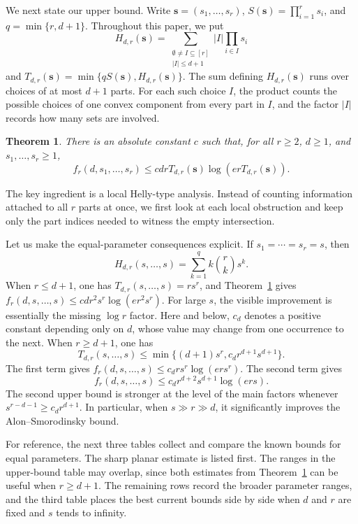 \documentclass[11pt]{article}
\newtheorem{theorem}{Theorem}[section]
\theoremstyle{definition}
\newcommand*{\abs}[1]{\lvert#1\rvert}
\begin{document}
We next state our upper bound. Write \(\boldsymbol{s}=(s_{1},\ldots,s_{r})\), \(S(\boldsymbol{s})=\prod_{i=1}^{r}s_{i}\), and \(q=\min\{r,d+1\}\). Throughout this paper, we put
\[
H_{d,r}(\boldsymbol{s})=\sum_{\substack{\emptyset\ne I\subseteq [r]\\ \abs{I}\le d+1}}\abs{I}\prod_{i\in I}s_{i}
\]
and \(T_{d,r}(\boldsymbol{s})=\min\{qS(\boldsymbol{s}),H_{d,r}(\boldsymbol{s})\}\). The sum defining \(H_{d,r}(\boldsymbol{s})\) runs over choices of at most \(d+1\) parts. For each such choice \(I\), the product counts the possible choices of one convex component from every part in \(I\), and the factor \(\abs{I}\) records how many sets are involved.
\begin{theorem}\label{thm:general-upper}
There is an absolute constant \(c\) such that, for all \(r\ge 2\), \(d\ge 1\), and \(s_{1},\ldots,s_{r}\ge 1\),
\[
f_{r}(d,s_{1},\ldots,s_{r})\le cdrT_{d,r}(\boldsymbol{s})\log(erT_{d,r}(\boldsymbol{s})).
\]
\end{theorem}

The key ingredient is a local Helly-type analysis. Instead of counting information attached to all \(r\) parts at once, we first look at each local obstruction and keep only the part indices needed to witness the empty intersection.

Let us make the equal-parameter consequences explicit. If \(s_{1}=\cdots=s_{r}=s\), then
\[
H_{d,r}(s,\ldots,s)=\sum_{k=1}^{q}k\binom{r}{k}s^{k}.
\]
When \(r\le d+1\), one has \(T_{d,r}(s,\ldots,s)=rs^{r}\), and Theorem~\ref{thm:general-upper} gives \(f_{r}(d,s,\ldots,s)\le cdr^{2}s^{r}\log(er^{2}s^{r})\). For large \(s\), the visible improvement is essentially the missing \(\log r\) factor. Here and below, \(c_{d}\) denotes a positive constant depending only on \(d\), whose value may change from one occurrence to the next. When \(r\ge d+1\), one has
\[
T_{d,r}(s,\ldots,s)\le \min\{(d+1)s^{r},c_{d}r^{d+1}s^{d+1}\}.
\]
The first term gives \(f_{r}(d,s,\ldots,s)\le c_{d}rs^{r}\log(ers^{r})\). The second term gives
\[
f_{r}(d,s,\ldots,s)\le c_{d}r^{d+2}s^{d+1}\log(ers).
\]
The second upper bound is stronger at the level of the main factors whenever \(s^{r-d-1}\ge c_{d}r^{d+1}\). In particular, when \(s\gg r\gg d\), it significantly improves the Alon--Smorodinsky bound.

For reference, the next three tables collect and compare the known bounds for equal parameters. The sharp planar estimate is listed first. The ranges in the upper-bound table may overlap, since both estimates from Theorem~\ref{thm:general-upper} can be useful when \(r\ge d+1\). The remaining rows record the broader parameter ranges, and the third table places the best current bounds side by side when \(d\) and \(r\) are fixed and \(s\) tends to infinity.
\end{document}

